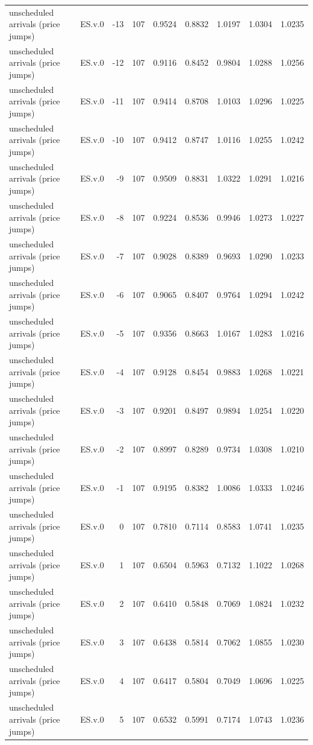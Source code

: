 \begin{tabular}{llrrrrrrr}
unscheduled arrivals (price jumps) & ES.v.0 & -13 & 107 & 0.9524 & 0.8832 & 1.0197 & 1.0304 & 1.0235 \\
unscheduled arrivals (price jumps) & ES.v.0 & -12 & 107 & 0.9116 & 0.8452 & 0.9804 & 1.0288 & 1.0256 \\
unscheduled arrivals (price jumps) & ES.v.0 & -11 & 107 & 0.9414 & 0.8708 & 1.0103 & 1.0296 & 1.0225 \\
unscheduled arrivals (price jumps) & ES.v.0 & -10 & 107 & 0.9412 & 0.8747 & 1.0116 & 1.0255 & 1.0242 \\
unscheduled arrivals (price jumps) & ES.v.0 & -9 & 107 & 0.9509 & 0.8831 & 1.0322 & 1.0291 & 1.0216 \\
unscheduled arrivals (price jumps) & ES.v.0 & -8 & 107 & 0.9224 & 0.8536 & 0.9946 & 1.0273 & 1.0227 \\
unscheduled arrivals (price jumps) & ES.v.0 & -7 & 107 & 0.9028 & 0.8389 & 0.9693 & 1.0290 & 1.0233 \\
unscheduled arrivals (price jumps) & ES.v.0 & -6 & 107 & 0.9065 & 0.8407 & 0.9764 & 1.0294 & 1.0242 \\
unscheduled arrivals (price jumps) & ES.v.0 & -5 & 107 & 0.9356 & 0.8663 & 1.0167 & 1.0283 & 1.0216 \\
unscheduled arrivals (price jumps) & ES.v.0 & -4 & 107 & 0.9128 & 0.8454 & 0.9883 & 1.0268 & 1.0221 \\
unscheduled arrivals (price jumps) & ES.v.0 & -3 & 107 & 0.9201 & 0.8497 & 0.9894 & 1.0254 & 1.0220 \\
unscheduled arrivals (price jumps) & ES.v.0 & -2 & 107 & 0.8997 & 0.8289 & 0.9734 & 1.0308 & 1.0210 \\
unscheduled arrivals (price jumps) & ES.v.0 & -1 & 107 & 0.9195 & 0.8382 & 1.0086 & 1.0333 & 1.0246 \\
unscheduled arrivals (price jumps) & ES.v.0 & 0 & 107 & 0.7810 & 0.7114 & 0.8583 & 1.0741 & 1.0235 \\
unscheduled arrivals (price jumps) & ES.v.0 & 1 & 107 & 0.6504 & 0.5963 & 0.7132 & 1.1022 & 1.0268 \\
unscheduled arrivals (price jumps) & ES.v.0 & 2 & 107 & 0.6410 & 0.5848 & 0.7069 & 1.0824 & 1.0232 \\
unscheduled arrivals (price jumps) & ES.v.0 & 3 & 107 & 0.6438 & 0.5814 & 0.7062 & 1.0855 & 1.0230 \\
unscheduled arrivals (price jumps) & ES.v.0 & 4 & 107 & 0.6417 & 0.5804 & 0.7049 & 1.0696 & 1.0225 \\
unscheduled arrivals (price jumps) & ES.v.0 & 5 & 107 & 0.6532 & 0.5991 & 0.7174 & 1.0743 & 1.0236 \\

\end{tabular}

